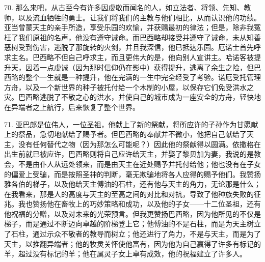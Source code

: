 70. 那么来吧，从古至今有许多因虔敬而闻名的人，如立法者、将领、先知、教师，以及流血牺牲的勇士。让我们将我们的主教与他们相比，从而认识他的功绩。亚当曾蒙天主的亲手所造，享受乐园的欢愉，并获赐最初的律法；但是，除非我冤枉了我们原祖的名声，他没有遵守诫命。而巴西略却接受并遵守了诫命，未从知善恶树受到伤害，逃脱了那旋转的火剑，并且我深信，他已抵达乐园。厄诺士首先呼求主名。巴西略不但自己呼求主，而且更伟大的是，他向别人宣讲主。哈诺客被提升天，因着一点虔诚（因为那时信仰仍在影中）获得提升，逃离了余生之险，但巴西略的整个一生就是一种提升，他在完满的一生中完全经受了考验。诺厄受托管理方舟，以及一个新世界的种子被托付给一个木制的小屋，以保存它们免受洪水之灾。巴西略逃脱了不敬之心的洪水，并使自己的城市成为一座安全的方舟，轻快地在异端者之上航行，后来恢复了整个世界。\par

71. 亚巴郎是位伟人，一位圣祖，他献上了新的祭献，将所应许的子孙作为甘愿献上的祭品，急切地献给了赐予者。但巴西略的奉献并不微小，他把自己献给了天主，没有任何替代之物（因为那怎么可能呢？）因此他的祭献得以圆满。依撒格在出生前就已被应许，巴西略则将自己应许给天主，并娶了黎贝加为妻，我说的是教会，不是由仆人从远处领来，而是由天主在近处赐予并托付给他；他也没有在子女的偏爱上受骗，而是按照圣神的判断，毫无欺骗地将各人应得的赐予他们。我赞扬雅各伯的梯子，以及他给天主傅油的石柱，还有他与天主的角力，无论那是什么；在我看来，那是人的高度与天主的至高之间的对比和对抗，导致了他种族失败的征兆。我也赞扬他在畜牧上的巧妙策略和成功，以及他的子女——十二位圣祖，还有他祝福的分赠，以及对未来的光荣预言。但我更赞扬巴西略，因为他所见的不仅是梯子，而是通过不断迈向卓越的阶梯登上它；他傅油的不是石柱，而是为天主树立了石柱，通过示众不敬者的教导而树立；他还进行了角力，不是与天主，而是为了天主，以推翻异端者；他的牧灵关怀使他富有，因为他为自己赢得了许多有标记的羊，超过没有标记的羊；他在属灵子女上卓有成效，他的祝福建立了许多人。\par

